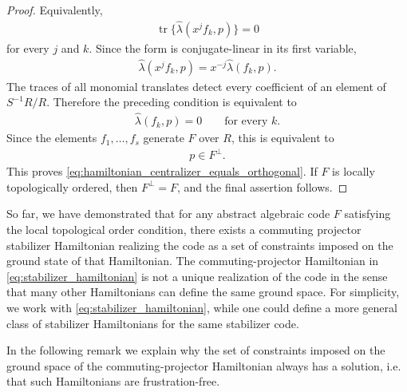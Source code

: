\documentclass[sn-mathphys-num]{sn-jnl}
\theoremstyle{definition}
\numberwithin{equation}{section}
\theoremstyle{definition}
\def\hl{{\hat \lambda}}
\def\tr{\operatorname{tr}}
\begin{document}
\begin{proof}
Equivalently,
\begin{align}
    \tr\{\hl(x^jf_k,p)\}=0
\end{align}
for every $j$ and $k$. Since the form is conjugate-linear in its first
variable,
\begin{align}
    \hl(x^jf_k,p)=x^{-j}\hl(f_k,p).
\end{align}
The traces of all monomial translates detect every coefficient of an element
of $S^{-1}R/R$. Therefore the preceding condition is equivalent to
\begin{align}
    \hl(f_k,p)=0
    \qquad
    \text{for every }k.
\end{align}
Since the elements $f_1,\ldots,f_s$ generate $F$ over $R$, this is
equivalent to
\begin{align}
    p\in F^{\perp}.
\end{align}
This proves
\eqref{eq:hamiltonian_centralizer_equals_orthogonal}. If $F$ is locally
topologically ordered, then $F^{\perp}=F$, and the final assertion follows.
\end{proof}

So far, we have demonstrated that for any abstract algebraic code $F$ satisfying the local topological order condition, there exists a commuting projector stabilizer Hamiltonian realizing the code as a set of constraints imposed on the ground state of that Hamiltonian. The commuting-projector Hamiltonian in \eqref{eq:stabilizer_hamiltonian} is not a unique realization of the code in the sense that many other Hamiltonians can define the same ground space. For simplicity, we work with \eqref{eq:stabilizer_hamiltonian}, while one could define a more general class of stabilizer Hamiltonians for the same stabilizer code.

In the following remark we explain why the set of constraints imposed on the ground space of the commuting-projector Hamiltonian always has a solution, i.e. that such Hamiltonians are frustration-free. 
\end{document}
